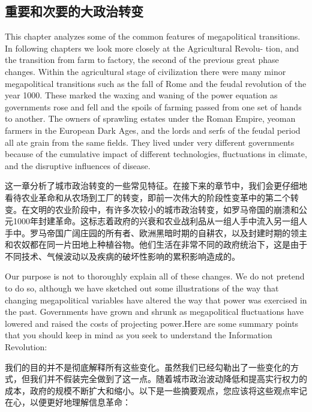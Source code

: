 \begin{Parallel}{97mm}{72mm}
  \subsection{重要和次要的大政治转变}


  \ParallelLText
  {This chapter analyzes some of the common features of megapolitical transitions. In following chapters we look more closely at the Agricultural Revolu- tion, and the transition from farm to factory, the second of the previous great phase changes. Within the agricultural stage of civilization there were many minor megapolitical transitions such as the fall of Rome and the feudal revolution of the year 1000. These marked the waxing and waning of the power equation as governments rose and fell and the spoils of farming passed from one set of hands to another. The owners of sprawling estates under the Roman Empire, yeoman farmers in the European Dark Ages, and the lords and serfs of the feudal period all ate grain from the same fields. They lived under very different governments because of the cumulative impact of different technologies, fluctuations in climate, and the disruptive influences of disease.}
  
  \ParallelRText
  {这一章分析了城市政治转变的一些常见特征。在接下来的章节中，我们会更仔细地看待农业革命和从农场到工厂的转变，即前一次伟大的阶段性变革中的第二个转变。在文明的农业阶段中，有许多次较小的城市政治转变，如罗马帝国的崩溃和公元1000年封建革命。这标志着政府的兴衰和农业战利品从一组人手中流入另一组人手中。罗马帝国广阔庄园的所有者、欧洲黑暗时期的自耕农，以及封建时期的领主和农奴都在同一片田地上种植谷物。他们生活在非常不同的政府统治下，这是由于不同技术、气候波动以及疾病的破坏性影响的累积影响造成的。}
  \ParallelPar



  \ParallelLText
  {Our purpose is not to thoroughly explain all of these changes. We do not pretend to do so, although we have sketched out some illustrations of the way that changing megapolitical variables have altered the way that power was exercised in the past. Governments have grown and shrunk as megapolitical fluctuations have lowered and raised the costs of projecting power.Here are some summary points that you should keep in mind as you seek to understand the Information Revolution:}
  
  \ParallelRText
  {我们的目的并不是彻底解释所有这些变化。虽然我们已经勾勒出了一些变化的方式，但我们并不假装完全做到了这一点。随着城市政治波动降低和提高实行权力的成本，政府的规模不断扩大和缩小。以下是一些摘要观点，您应该将这些观点牢记在心，以便更好地理解信息革命：}
  \ParallelPar




\end{Parallel}
